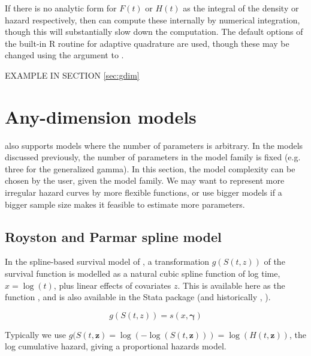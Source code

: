 \documentclass[nojss,nofooter]{jss}
\begin{document}
If there is no analytic form for $F(t)$ or $H(t)$ as the integral of
the density or hazard respectively, then  can compute
these internally by numerical integration, though this will
substantially slow down the computation.  The default options of the
built-in R routine  for adaptive quadrature are used,
though these may be changed using the  argument to
.

EXAMPLE IN SECTION \ref{sec:gdim} 




\section{Any-dimension models}

 also supports models where the number of parameters is
arbitrary.  In the models discussed previously, the number of
parameters in the model family is fixed (e.g. three for the
generalized gamma).  In this section, the model complexity can be
chosen by the user, given the model family.  We may want to represent
more irregular hazard curves by more flexible functions, or use bigger
models if a bigger sample size makes it feasible to estimate more
parameters.


\subsection{Royston and Parmar spline model}
\label{sec:spline}

In the spline-based survival model of \citet{royston:parmar}, a
transformation $g(S(t,z))$ of the survival function is modelled as a
natural cubic spline function of log time, $x = \log(t)$, plus linear
effects of covariates $z$.  This is available here as the function
,  and is also available in the Stata package
 \citep{stpm2} (and historically , \citet{stpm:orig,stpm:update}).

  \[g(S(t,z)) = s(x, \bm{\gamma})\]

Typically we use $g(S(t,\mathbf{z}) = \log(-\log(S(t,\mathbf{z}))) =
\log(H(t,\mathbf{z}))$, the log cumulative hazard, giving a
proportional hazards model.    
\end{document}
